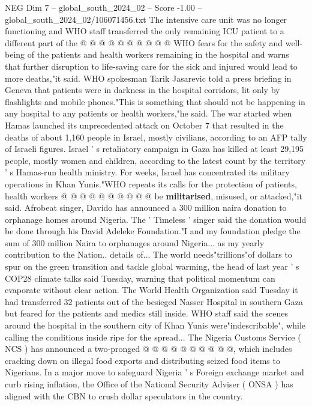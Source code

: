 \begin{textsample}{NEG Dim 7 – global\_south\_2024\_02 – Score -1.00 – global\_south\_2024\_02/106071456.txt}
The intensive care unit was no longer functioning and WHO staff transferred the only remaining ICU patient to a different part of the @ @ @ @ @ @ @ @ @ @ WHO fears for the safety and well-being of the patients and health workers remaining in the hospital and warns that further disruption to life-saving care for the sick and injured would lead to more deaths,"it said.
WHO spokesman Tarik Jasarevic told a press briefing in Geneva that patients were in darkness in the hospital corridors, lit only by flashlights and mobile phones."This is something that should not be happening in any hospital to any patients or health workers,"he said.
The war started when Hamas launched its unprecedented attack on October 7 that resulted in the deaths of about 1,160 people in Israel, mostly civilians, according to an AFP tally of Israeli figures.
Israel ' s retaliatory campaign in Gaza has killed at least 29,195 people, mostly women and children, according to the latest count by the territory ' s Hamas-run health ministry.
For weeks, Israel has concentrated its military operations in Khan Yunis."WHO repeats its calls for the protection of patients, health workers @ @ @ @ @ @ @ @ @ @ be \textbf{militarised}, misused, or attacked,"it said.
Afrobeat singer, Davido has announced a 300 million naira donation to orphanage homes around Nigeria.
The ' Timeless ' singer said the donation would be done through his David Adeleke Foundation."I and my foundation pledge the sum of 300 million Naira to orphanages around Nigeria... as my yearly contribution to the Nation.. details of...
The world needs"trillions"of dollars to spur on the green transition and tackle global warming, the head of last year ' s COP28 climate talks said Tuesday, warning that political momentum can evaporate without clear action.
The World Health Organization said Tuesday it had transferred 32 patients out of the besieged Nasser Hospital in southern Gaza but feared for the patients and medics still inside.
WHO staff said the scenes around the hospital in the southern city of Khan Yunis were"indescribable", while calling the conditions inside ripe for the spread...
The Nigeria Customs Service ( NCS ) has announced a two-pronged @ @ @ @ @ @ @ @ @ @, which includes cracking down on illegal food exports and distributing seized food items to Nigerians.
In a major move to safeguard Nigeria ' s Foreign exchange market and curb rising inflation, the Office of the National Security Adviser ( ONSA ) has aligned with the CBN to crush dollar speculators in the country.

\end{textsample}
